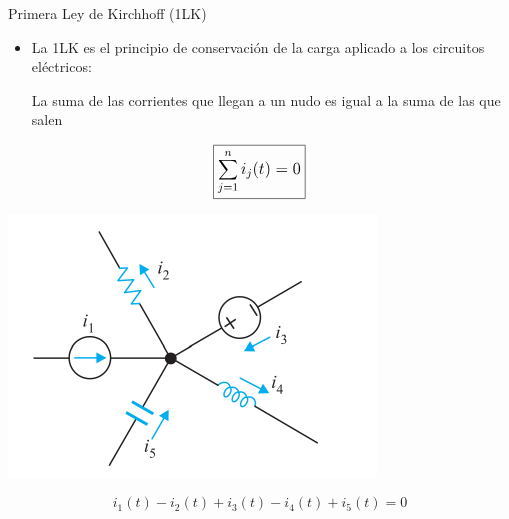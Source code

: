 \documentclass[aspectratio=169, xcolor={usenames,svgnames,dvipsnames}]{beamer}
\begin{document}

\begin{frame}{Primera Ley de Kirchhoff (1LK)}
    \begin{itemize}
        \item La \alert{1LK} es el principio de \alert{conservación de la carga} aplicado a los circuitos eléctricos:
        \vspace{2mm}
        
        La suma de las corrientes que llegan a un nudo es igual a la suma de las que salen      
    \end{itemize}
    \vspace{2mm}
    \begin{equation*}
            \large{\boxed{\sum_{j=1}^n i_j(t)=0}}
        \end{equation*}
    \begin{center}
        \includegraphics[height=0.4\textheight]{../figs/LKC_FM.pdf}
    \end{center}
    \[
        i_1(t) - i_2(t) + i_3(t) - i_4(t) + i_5(t) = 0
    \]
\end{frame}

\end{document}
